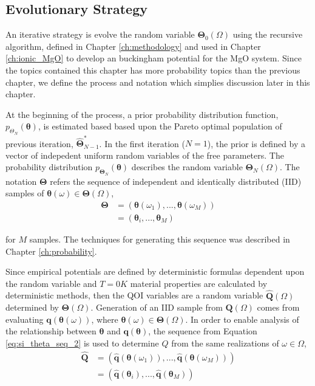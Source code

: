 \subsection{Evolutionary Strategy}

An iterative strategy is evolve the random variable $\bm{\Theta}_0(\Omega)$ using the recursive algorithm, defined in Chapter \ref{ch:methodology} and used in Chapter \ref{ch:ionic_MgO} to develop an buckingham potential for the MgO system.  Since the topics contained this chapter has more probability topics than the previous chapter, we define the process and notation which simplies discussion later in this chapter.

At the beginning of the process, a prior probability distribution function, $p_{\Theta_N}(\bm{\theta})$, is estimated based based upon the Pareto optimal population of previous iteration, 
$\hat{\bm{\Theta}}_{N-1}^*$.
In the first iteration ($N=1$), the prior is defined by a vector of indepedent uniform random variables of the free parameters.
The probability distribution $p_{\bm{\Theta}_N}(\bm{\theta})$ describes the random variable $\bm{\Theta}_{N}(\Omega)$.
The notation $\bm{\Theta}$ refers the sequence of independent and identically distributed (IID) samples of $\bm{\theta}(\omega) \in \bm{\Theta}(\Omega)$,
\begin{subequations}
  \begin{align}
     \bm{\Theta}
       &= (\bm{\theta}(\omega_1), ...,\bm{\theta}(\omega_M)) 
	  \label{eq:si_theta_seq_1} \\
       &= (\bm{\theta}_i,...,\bm{\theta}_M) 
	  \label{eq:si_theta_seq_2}
  \end{align}
\end{subequations}

for $M$ samples.
The techniques for generating this sequence was described in Chapter \ref{ch:probability}.

Since empirical potentials are defined by deterministic formulas dependent upon the random variable and $T=0K$ material properties are calculated by deterministic methods, then the QOI variables are a random variable $\hat{\bm{Q}}(\Omega)$ determined by $\bm{\Theta}(\Omega)$.
Generation of an IID sample from $\bm{Q}(\Omega)$ comes from evaluating $\bm{q}(\bm{\theta}(\omega))$, where $\bm{\theta}(\omega) \in \bm{\Theta}(\Omega)$.
In order to enable analysis of the relationship between $\bm{\theta}$ and $\bm{q}(\bm{\theta})$, the sequence from Equation \ref{eq:si_theta_seq_2} is used to determine $Q$ from the same realizations of $\omega \in \Omega$,
\begin{subequations}
  \begin{align}
     \hat{\bm{Q}}
       &= (\hat{\bm{q}}(\bm{\theta}(\omega_1)),
           ...,
           \hat{\bm{q}}(\bm{\theta}(\omega_M))
          )
      \label{eq:si_qoi_seq_1} \\
       &= (\hat{\bm{q}}(\bm{\theta}_i),
           ...,
           \hat{\bm{q}}(\bm{\theta}_M)
          )
      \label{eq:si_qoi_seq_2}
  \end{align}
\end{subequations}

